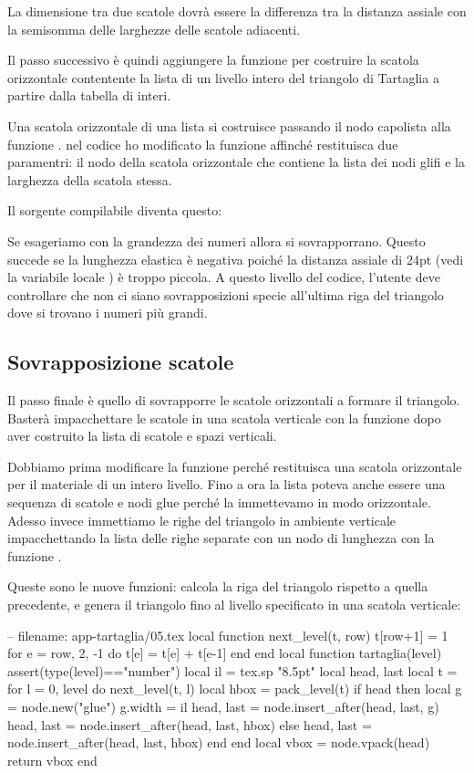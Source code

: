 La dimensione tra due scatole dovrà essere la differenza tra la distanza assiale
con la semisomma delle larghezze delle scatole adiacenti.

Il passo successivo è quindi aggiungere la funzione  per
costruire la scatola orizzontale contentente la lista di un livello intero del
triangolo di Tartaglia a partire dalla tabella di interi.

Una scatola orizzontale di una lista si costruisce passando il nodo capolista
alla funzione . nel codice ho modificato la funzione 
affinché restituisca due paramentri: il nodo della scatola orizzontale che
contiene la lista dei nodi glifi e la larghezza della scatola stessa.

Il sorgente compilabile diventa questo:

Se esageriamo con la grandezza dei numeri allora si sovrapporrano. Questo
succede se la lunghezza elastica è negativa poiché la distanza assiale di 24pt
(vedi la variabile locale ) è troppo piccola. A questo livello del
codice, l'utente deve controllare che non ci siano sovrapposizioni specie
all'ultima riga del triangolo dove si trovano i numeri più grandi.


\subsection{Sovrapposizione scatole}

Il passo finale è quello di sovrapporre le scatole orizzontali a formare il
triangolo. Basterà impacchettare le scatole in una scatola verticale con la
funzione  dopo aver costruito la lista di scatole e spazi
verticali.

Dobbiamo prima modificare la funzione  perché restituisca una
scatola orizzontale per il materiale di un intero livello. Fino a ora la lista
poteva anche essere una sequenza di scatole e nodi glue perché la immettevamo in
modo orizzontale. Adesso invece immettiamo le righe del triangolo in ambiente
verticale impacchettando la lista delle righe separate con un nodo di lunghezza
con la funzione .

Queste sono le nuove funzioni:  calcola la riga del triangolo
rispetto a quella precedente, e  genera il triangolo fino al
livello specificato in una scatola verticale:
\begin{lines}
-- filename: app-tartaglia/05.tex
local function next_level(t, row)
    t[row+1] = 1
    for e = row, 2, -1 do
        t[e] = t[e] + t[e-1]
    end
end
local function tartaglia(level)
    assert(type(level)=="number")
    local il = tex.sp "8.5pt"
    local head, last
    local t = {}
    for l = 0, level do
        next_level(t, l)
        local hbox = pack_level(t)
        if head then
            local g = node.new("glue")
            g.width = il
            head, last = node.insert_after(head, last, g)
            head, last = node.insert_after(head, last, hbox)
        else
            head, last = node.insert_after(head, last, hbox)
        end
    end
    local vbox = node.vpack(head)
    return vbox
end
\end{lines}


